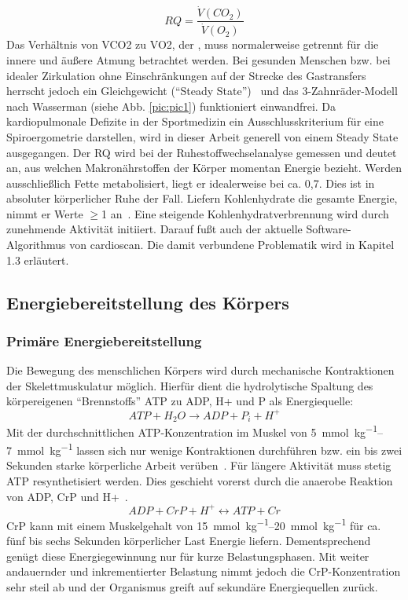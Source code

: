 %
\begin{equation}
RQ = \frac{\dot{V}(CO_2)}{\dot{V}(O_2)}
\label{eq:formel1}
\end{equation}
%
Das Verhältnis von \acrfull{VCO2} zu \acrfull{VO2}, der , muss normalerweise getrennt für die innere und äußere Atmung betrachtet werden. Bei gesunden Menschen bzw. bei idealer Zirkulation ohne Einschränkungen auf der Strecke des Gastransfers herrscht jedoch ein Gleichgewicht ("`Steady State"')~\cite{Kroidl.2015} und das 3-Zahnräder-Modell nach Wasserman (siehe Abb. \ref{pic:pic1}) funktioniert einwandfrei. Da kardiopulmonale Defizite in der Sportmedizin ein Ausschlusskriterium für eine Spiroergometrie darstellen, wird in dieser Arbeit generell von einem Steady State ausgegangen. Der RQ wird bei der Ruhestoffwechselanalyse gemessen und deutet an, aus welchen Makronährstoffen der Körper momentan Energie bezieht. Werden ausschließlich Fette metabolisiert, liegt er idealerweise bei ca. 0,7. Dies ist in absoluter körperlicher Ruhe der Fall. Liefern Kohlenhydrate die gesamte Energie, nimmt er Werte $\geq$1 an~\cite{Kroidl.2015}. Eine steigende Kohlenhydratverbrennung wird durch zunehmende Aktivität initiiert. Darauf fußt auch der aktuelle Software-Algorithmus von cardioscan. Die damit verbundene Problematik wird in Kapitel 1.3 erläutert.
%
\subsection{Energiebereitstellung des Körpers}
%
\subsubsection{Primäre Energiebereitstellung}
%
Die Bewegung des menschlichen Körpers wird durch mechanische Kontraktionen der Skelettmuskulatur möglich. Hierfür dient die hydrolytische Spaltung des körpereigenen "`Brennstoffs"' \gls{ATP} zu \gls{ADP}, \gls{H+} und \gls{P} als Energiequelle:
%
\begin{equation}
ATP + H_2O \rightarrow ADP + P_i + H^+
\label{eq:formel2}
\end{equation}
%
Mit der durchschnittlichen \gls{ATP}-Konzentration im Muskel von \SIrange{5}{7}{\milli\mole\per\kg} lassen sich nur wenige Kontraktionen durchführen bzw. ein bis zwei Sekunden starke körperliche Arbeit verüben~\cite{DeMarees.1981}. Für längere Aktivität muss stetig \gls{ATP} resynthetisiert werden. Dies geschieht vorerst durch die anaerobe Reaktion von \gls{ADP}, \gls{CrP} und \gls{H+}~\cite{Heck.2006}.
%
\begin{equation}
ADP + CrP + H^+ \leftrightarrow ATP + Cr
\label{eq:formel3}
\end{equation}
%
\gls{CrP} kann mit einem Muskelgehalt von \SIrange{15}{20}{\milli\mole\per\kg} für ca. fünf bis sechs Sekunden körperlicher Last Energie liefern. Dementsprechend genügt diese Energiegewinnung nur für kurze Belastungsphasen. Mit weiter andauernder und inkrementierter Belastung nimmt jedoch die \gls{CrP}-Konzentration sehr steil ab und der Organismus greift auf sekundäre Energiequellen zurück.
\clearpage
